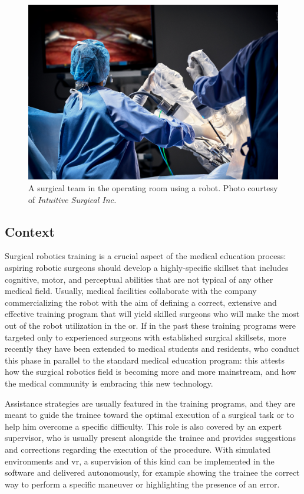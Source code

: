 \documentclass[../main.tex]{subfiles}
\begin{document}
\begin{figure}[h]
    \centering
    \includegraphics[width=\textwidth]{images/davinci_or.jpg}
    \caption{A surgical team in the operating room using a \davinci robot. Photo courtesy of \textit{Intuitive Surgical Inc.}}
    \label{fig:davincior}
\end{figure}

\subsection{Context}
Surgical robotics training is a crucial aspect of the medical education process: aspiring robotic surgeons should develop a highly-specific skillset that includes cognitive, motor, and perceptual abilities that are not typical of any other medical field. Usually, medical facilities collaborate with the company commercializing the robot with the aim of defining a correct, extensive and effective training program that will yield skilled surgeons who will make the most out of the robot utilization in the \ac{or}. If in the past these training programs were targeted only to experienced surgeons with established surgical skillsets, more recently they have been extended to medical students and residents, who conduct this phase in parallel to the standard medical education program: this attests how the surgical robotics field is becoming more and more mainstream, and how the medical community is embracing this new technology. 

Assistance strategies are usually featured in the training programs, and they are meant to guide the trainee toward the optimal execution of a surgical task or to help him overcome a specific difficulty. This role is also covered by an expert supervisor, who is usually present alongside the trainee and provides suggestions and corrections regarding the execution of the procedure. With simulated environments and \ac{vr}, a supervision of this kind can be implemented in the software and delivered autonomously, for example showing the trainee the correct way to perform a specific maneuver or highlighting the presence of an error. 
\end{document}
